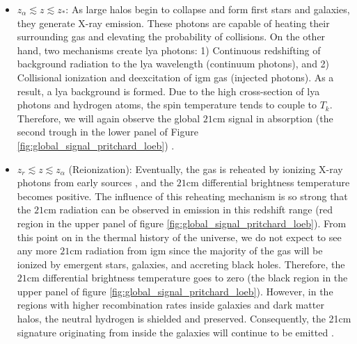 \documentclass[12pt, TexShade, letterpaper]{report}
\begin{document}
\begin{itemize}
\item $z_\alpha \lesssim z \lesssim z_*$: As large halos begin to collapse and form first stars and galaxies, they generate X-ray emission. These photons are capable of heating their surrounding gas and elevating 
 the probability of collisions. On the other hand, two mechanisms create \gls{lya} photons: 1) Continuous redshifting of background radiation to the \gls{lya} wavelength (continuum photons), and 2) Collisional ionization and deexcitation of \gls{igm} gas (injected photons). As a result, a \gls{lya} background is formed. Due to the high cross-section of \gls{lya} photons and hydrogen atoms, the spin temperature tends to couple to $T_k$. Therefore, we will again observe the global $\mathrm{21cm}$ signal in absorption (the second trough in the lower panel of Figure \ref{fig:global_signal_pritchard_loeb}) \cite{map_universe, 21century}.\par

\item $z_r \lesssim z \lesssim z_\alpha$ (Reionization): Eventually, the gas is reheated by ionizing X-ray photons from early sources \cite{21century}, and the $\mathrm{21cm}$ differential brightness temperature becomes positive. The influence of this reheating mechanism is so strong that the $\mathrm{21cm}$ radiation can be observed in emission in this redshift range (red region in the upper panel of figure \ref{fig:global_signal_pritchard_loeb}). From this point on in the thermal history of the universe, we do not expect to see any more $\mathrm{21cm}$ radiation from \gls{igm} since the majority of the gas will be ionized by emergent stars, galaxies, and accreting black holes. Therefore, the $\mathrm{21cm}$ differential brightness temperature goes to zero (the black region in the upper panel of figure \ref{fig:global_signal_pritchard_loeb}). However, in the regions with higher recombination rates inside galaxies and dark matter halos, the neutral hydrogen is shielded and preserved. Consequently, the 21cm signature originating from inside the galaxies will continue to be emitted \cite{map_universe, 21century}.\par
\end{itemize}
\end{document}
